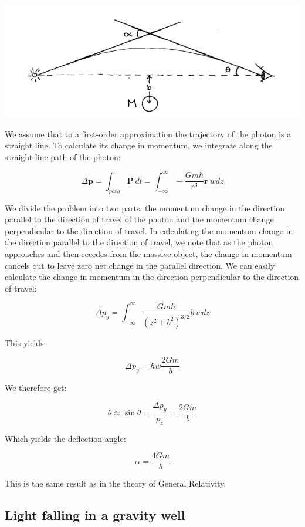 \documentclass {article}
\renewcommand\vec{\mathbf}
\begin{document}
\begin{center}
	\includegraphics[scale=0.4]{light-bending.png}
\end{center}


We assume that to a first-order approximation the trajectory of the photon is a straight line. To calculate its change in momentum, we integrate along the straight-line path of the photon:

$$\Delta \vec p = \int_{path} \vec P ~ dl = \int_{-\infty}^{\infty} - \frac {Gm\hbar}{r^3} \vec r ~ wdz $$

We divide the problem into two parts: the momentum change in the direction parallel to the direction of travel of the photon and the momentum change perpendicular to the direction of travel. In calculating the momentum change in the direction parallel to the direction of travel, we note that as the photon approaches and then recedes from the massive object, the change in momentum cancels out to leave zero net change in the parallel direction. We can easily calculate the change in momentum in the direction perpendicular to the direction of travel:

$$\Delta p_y = \int_{-\infty}^{\infty}  \frac {Gm\hbar}{(z^2 + b^2)^{3/2}} b ~ wdz $$

This yields:

$$\Delta p_y = \hbar w \frac {2Gm} b$$

We therefore get:

$$\theta \approx \sin \theta = \frac {\Delta p_y}{p_z} = \frac {2Gm} b$$

Which yields the deflection angle:

$$\alpha = \frac {4Gm} b$$

This is the same result as in the theory of General Relativity.

\newpage
\subsection{Light falling in a gravity well}
\end{document}
